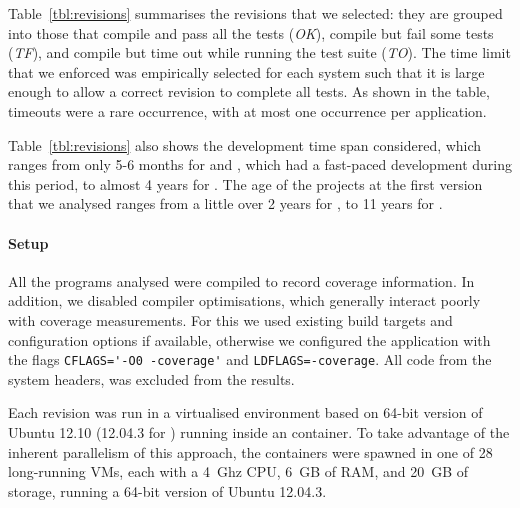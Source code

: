 Table~\ref{tbl:revisions} summarises the revisions that we selected:
they are grouped into those that compile and pass all the tests
(\textit{OK}), compile but fail some tests (\textit{TF}),
and compile but time out while running the test suite
(\textit{TO}).
The time limit that we enforced was empirically selected for
each system such that it is large enough to allow a correct revision
to complete all tests. As shown in the table, timeouts were a rare
occurrence, with at most one occurrence per application.

Table~\ref{tbl:revisions} also shows the development time span
considered, which ranges from only 5-6 months for \git and \redis,
which had a fast-paced development during this period, to almost 4
years for \memcached. The age of the projects at the first version
that we analysed ranges from a little over 2 years for \lighttpdtwo,
to 11 years for \binutils.

\paragraph{Setup} All the programs analysed were compiled to record coverage
information. In addition, we disabled compiler optimisations, which generally
interact poorly with coverage measurements. For this we used existing build
targets and configuration options if available, otherwise we configured the
application with the flags \lstinline`CFLAGS='-O0 -coverage'` and
\lstinline`LDFLAGS=-coverage`. All code from the system headers, \ie
{} was excluded from the results.

Each revision was run in a virtualised environment based on 64-bit version of
Ubuntu 12.10 (12.04.3 for \git) running inside an \lxc container.  To take
advantage of the inherent parallelism of this approach, the containers were
spawned in one of 28 long-running \xen VMs, each with a 4~Ghz CPU, 6~GB of RAM,
and 20~GB of storage, running a 64-bit version of Ubuntu 12.04.3.

